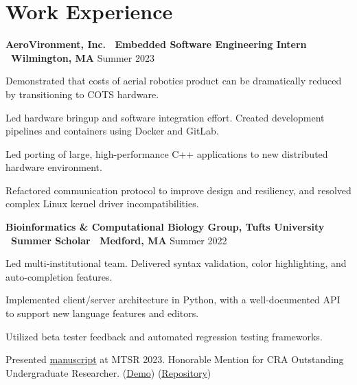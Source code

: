 \documentclass[letter,10pt]{article}
\newenvironment{mylist}[1][]
    {\itemize[nosep, wide=0pt, leftmargin=*, after=\strut]}
    {\enditemize}
\begin{document}

\section{Work Experience}
\begin{minipage}[t]{\linewidth}
    \textbf{AeroVironment, Inc. \textbar \ Embedded Software Engineering Intern \textbar \ Wilmington, MA} \hfill Summer 2023 
    \begin{mylist}
        \item Demonstrated that costs of aerial robotics product can be dramatically reduced by transitioning to COTS hardware. 
        \item Led hardware bringup and software integration effort. Created development pipelines and containers using Docker and GitLab. 
        \item Led porting of large, high-performance C++ applications to new distributed hardware environment. 
        \item Refactored communication protocol to improve design and resiliency, and resolved complex Linux kernel driver incompatibilities.
    \end{mylist}
\end{minipage}


\begin{minipage}[t]{\linewidth}
    \textbf{Bioinformatics \& Computational Biology Group, Tufts University \textbar \ Summer Scholar \textbar \ Medford, MA} \hfill Summer 2022
    \begin{mylist}
        \item Led multi-institutional team. Delivered syntax validation, color highlighting, and auto-completion features.
        \item Implemented client/server architecture in Python, with a well-documented API to support new language features and editors. 
        \item Utilized beta tester feedback and automated regression testing frameworks.
        \item Presented \href{https://www.eecs.tufts.edu/~lstran01/files/context-sensitive.pdf}{manuscript} at MTSR 2023. Honorable Mention for CRA Outstanding Undergraduate Researcher. (\href{https://youtu.be/TFLdXxnaBlU}{Demo}) (\href{https://github.com/liam-strand/medford-language-server}{Repository})
    \end{mylist}
\end{minipage}
\end{document}
